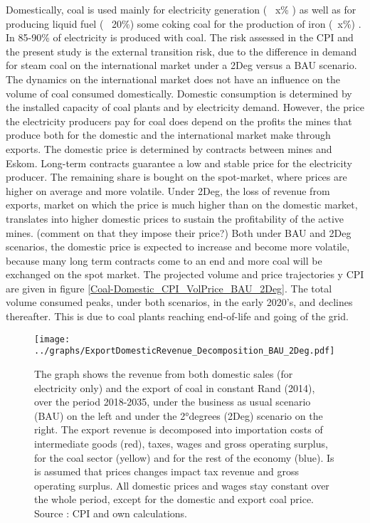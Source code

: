 \documentclass[12pt,english]{article}
\begin{document}
Domestically, coal is used mainly for electricity generation (~ x\% ) as well as for producing liquid fuel (~ 20\%) some coking coal for the production of iron (~x\%) \citep{}. In 85-90\% of electricity is produced with coal. The risk assessed in the CPI and the present study is the external transition risk, due to the difference in demand for steam coal on the international market under a 2Deg versus a BAU scenario. The dynamics on the international market does not have an influence on the volume of coal consumed domestically. Domestic consumption is determined by the installed capacity of coal plants and by electricity demand. However, the price the electricity producers pay for coal does depend on the profits the mines that produce both for the domestic and the international market make through exports. The domestic price is determined by contracts between mines and Eskom. Long-term contracts guarantee a low and stable price for the electricity producer. The remaining share is bought on the spot-market, where prices are higher on average and more volatile. Under 2Deg, the loss of revenue from exports, market on which the price is much higher than on the domestic market, translates into higher domestic prices to sustain the profitability of the active mines. (comment on that they impose their price?) Both under BAU and 2Deg scenarios, the domestic price is expected to increase and become more volatile, because many long term contracts come to an end and more coal will be exchanged on the spot market. The projected volume and price trajectories y CPI are given in figure \ref{Coal-Domestic_CPI_VolPrice_BAU_2Deg}. The total volume consumed peaks, under both scenarios, in the early 2020's, and declines thereafter. This is due to coal plants reaching end-of-life and going of the grid.

\begin{figure}[!t]
	\hspace{-10pt}\texttt{[image: ../graphs/ExportDomesticRevenue\_Decomposition\_BAU\_2Deg.pdf]}
	\caption{\label{ExportDomesticRevenue_Decomposition_BAU_2Deg}\small The graph shows the revenue from both domestic sales (for electricity only) and the export of coal in constant Rand (2014), over the period 2018-2035, under the business as usual scenario (BAU) on the left and under the 2°degrees (2Deg) scenario on the right. The export revenue is decomposed into importation costs of intermediate goods (red), taxes, wages and gross operating surplus, for the coal sector (yellow) and for the rest of the economy (blue). Is is assumed that prices changes impact tax revenue and gross operating surplus. All domestic prices and wages stay constant over the whole period, except for the domestic and export coal price. Source : CPI and own calculations. }
\end{figure}
\end{document}
